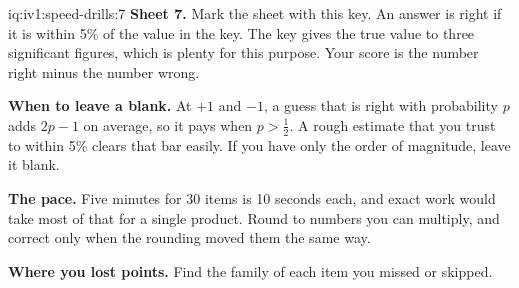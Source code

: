 \begin{solution}{iq:iv1:speed-drills:7}
\textbf{Sheet 7.} Mark the sheet with this key. An answer is right if it is within 5\% of the value in the key. The key gives the true value to three significant figures, which is plenty for this purpose. Your score is the number right minus the number wrong.
\par\nopagebreak


\textbf{When to leave a blank.} At $+1$ and $-1$, a guess that is right with probability $p$ adds $2p - 1$ on average, so it pays when $p > \tfrac12$. A rough estimate that you trust to within 5\% clears that bar easily. If you have only the order of magnitude, leave it blank.

\textbf{The pace.} Five minutes for 30 items is 10 seconds each, and exact work would take most of that for a single product. Round to numbers you can multiply, and correct only when the rounding moved them the same way.

\textbf{Where you lost points.} Find the family of each item you missed or skipped.


\end{solution}

